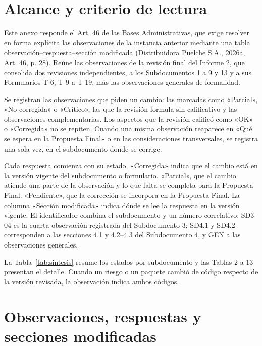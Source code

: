\documentclass[carta,firma]{lafrox}
\begin{document}
\portadalafrox
\indicelafrox

\section{Alcance y criterio de lectura}

Este anexo responde el Art. 46 de las Bases Administrativas, que exige resolver en forma explícita las observaciones de la instancia anterior mediante una tabla observación–respuesta–sección modificada (Distribuidora Puelche S.A., 2026a, Art. 46, p. 28). Reúne las observaciones de la revisión final del Informe 2, que consolida dos revisiones independientes, a los Subdocumentos 1 a 9 y 13 y a sus Formularios T-6, T-9 a T-19, más las observaciones generales de formalidad.

Se registran las observaciones que piden un cambio: las marcadas como «Parcial», «No corregida» o «Crítico», las que la revisión formula sin calificativo y las observaciones complementarias. Los aspectos que la revisión calificó como «OK» o «Corregida» no se repiten. Cuando una misma observación reaparece en «Qué se espera en la Propuesta Final» o en las consideraciones transversales, se registra una sola vez, en el subdocumento donde se corrige.

Cada respuesta comienza con su estado. «Corregida» indica que el cambio está en la versión vigente del subdocumento o formulario. «Parcial», que el cambio atiende una parte de la observación y lo que falta se completa para la Propuesta Final. «Pendiente», que la corrección se incorpora en la Propuesta Final. La columna «Sección modificada» indica dónde se lee la respuesta en la versión vigente. El identificador combina el subdocumento y un número correlativo: SD3-04 es la cuarta observación registrada del Subdocumento 3; SD4.1 y SD4.2 corresponden a las secciones 4.1 y 4.2–4.3 del Subdocumento 4, y GEN a las observaciones generales.

La Tabla~\ref{tab:sintesis} resume los estados por subdocumento y las Tablas 2 a 13 presentan el detalle. Cuando un riesgo o un paquete cambió de código respecto de la versión revisada, la observación indica ambos códigos.



\clearpage
{}
\section{Observaciones, respuestas y secciones modificadas}

\end{document}
